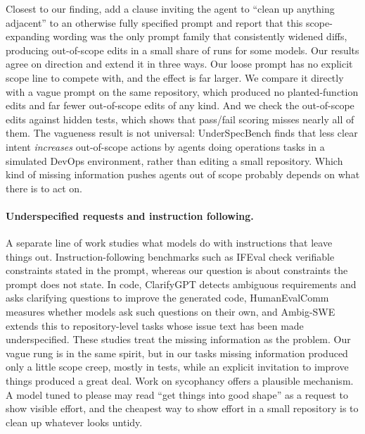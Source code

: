 Closest to our finding, \citet{weinberger2026promptinduced} add a clause
inviting the agent to ``clean up anything adjacent'' to an otherwise fully
specified prompt and report that this scope-expanding wording was the only
prompt family that consistently widened diffs, producing out-of-scope edits
in a small share of runs for some models. Our results agree on direction and
extend it in three ways. Our loose prompt has no explicit scope line to
compete with, and the effect is far larger. We compare it directly with a
vague prompt on the same repository, which produced no planted-function
edits and far fewer out-of-scope edits of any kind. And we check the out-of-scope edits
against hidden tests, which shows that pass/fail scoring misses nearly all of
them. The vagueness result is not universal: UnderSpecBench
\citep{ji2026coding} finds that less clear intent \emph{increases}
out-of-scope actions by agents doing operations tasks in a simulated DevOps
environment, rather than editing a small repository. Which kind of
missing information pushes agents out of scope probably depends on what
there is to act on.

\paragraph{Underspecified requests and instruction following.}
A separate line of work studies what models do with instructions that leave
things out. Instruction-following benchmarks such as IFEval
\citep{zhou2023instructionfollowing} check verifiable constraints stated in
the prompt, whereas our question is about constraints the prompt does not
state. In code, ClarifyGPT \citep{mu2023clarifygpt} detects ambiguous requirements
and asks clarifying questions to improve the generated code, HumanEvalComm
\citep{wu2025humanevalcomm} measures whether models ask such questions on
their own, and Ambig-SWE \citep{vijayvargiya2026ambigswe} extends
this to repository-level tasks whose issue text has been made underspecified.
These studies treat the missing information as the problem. Our vague rung is
in the same spirit, but in our tasks missing information produced only a
little scope creep, mostly in tests, while an explicit invitation to improve
things produced a great deal. Work on sycophancy \citep{sharma2024towards,perez2023discovering} offers a
plausible mechanism. A model tuned to please may read ``get things into good
shape'' as a request to show visible effort, and the cheapest way to show
effort in a small repository is to clean up whatever looks untidy.
